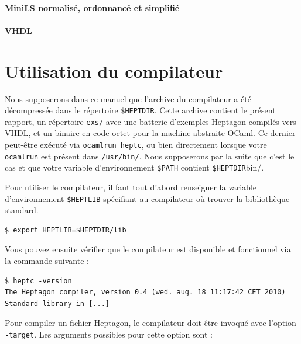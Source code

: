 \documentclass[a4paper]{article}
\newcommand{\LANG}{Heptagon}
\begin{document}
\small

\normalsize

\paragraph{MiniLS normalis\'e, ordonnanc\'e et simplifi\'e}

\small

\normalsize

\paragraph{VHDL}

\small

\normalsize

\section{Utilisation du compilateur}

Nous supposerons dans ce manuel que l'archive du compilateur a \'et\'e d\'ecompress\'ee
dans le r\'epertoire \verb/$HEPTDIR/. Cette archive contient le pr\'esent rapport,
un r\'epertoire \texttt{exs/} avec une batterie d'exemples \LANG{} compil\'es vers
VHDL, et un binaire en code-octet pour la machine abstraite OCaml. Ce dernier
peut-\^etre ex\'ecut\'e via \texttt{ocamlrun heptc}, ou bien directement lorsque votre
\texttt{ocamlrun} est pr\'esent dans \texttt{/usr/bin/}. Nous supposerons par la
suite que c'est le cas et que votre variable d'environnement \verb/$PATH/
contient \verb/$HEPTDIR/bin/.

Pour utiliser le compilateur, il faut tout d'abord renseigner la variable
d'environnement \verb/$HEPTLIB/ sp\'ecifiant au compilateur o\`u trouver la
biblioth\`eque standard.

\begin{verbatim}
$ export HEPTLIB=$HEPTDIR/lib
\end{verbatim}

Vous pouvez ensuite v\'erifier que le compilateur est disponible et fonctionnel
via la commande suivante :

\begin{verbatim}
$ heptc -version
The Heptagon compiler, version 0.4 (wed. aug. 18 11:17:42 CET 2010)
Standard library in [...]
\end{verbatim}

Pour compiler un fichier \LANG{}, le compilateur doit \^etre invoqu\'e avec l'option
\verb/-target/. Les arguments possibles pour cette option sont :
\end{document}

